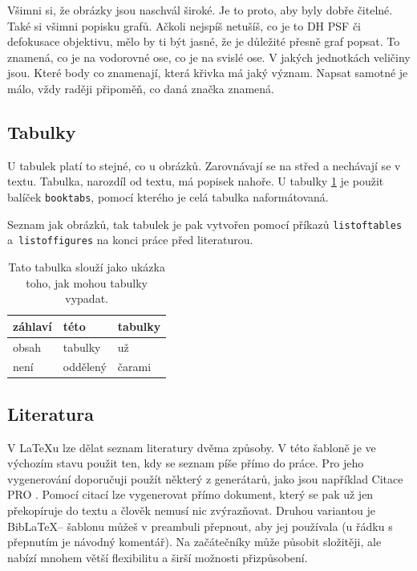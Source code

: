 \documentclass[12pt, a4paper,
    twoside,        %
    openright
]{report}
\begin{document}
Všimni si, že obrázky jsou naschvál široké. Je to proto, aby byly dobře čitelné. Také si všimni popisku grafů. Ačkoli nejspíš netušíš, co je to DH PSF či defokusace objektivu, mělo by ti být jasné, že je důležité přesně graf popsat. To znamená, co je na vodorovné ose, co je na svislé ose. V jakých jednotkách veličiny jsou. Které body co znamenají, která křivka má jaký význam. Napsat samotné \uv{$\Delta \varphi$} je málo, vždy raději připoměň, co daná značka znamená.

\subsection{Tabulky}

U tabulek platí to stejné, co u obrázků. Zarovnávají se na střed a nechávají se  v textu. Tabulka, narozdíl od textu, má popisek nahoře. U tabulky \ref{tab:ukazka} je použit balíček \texttt{booktabs}, pomocí kterého je celá tabulka naformátovaná.

Seznam jak obrázků, tak tabulek je pak vytvořen pomocí příkazů \texttt{listoftables} a~\texttt{list\-of\-fig\-ures} na konci práce před literaturou.

\begin{table}[b]
    \caption{Tato tabulka slouží jako ukázka toho, jak mohou tabulky vypadat.} %
    \label{tab:ukazka} %
    \centering
        \begin{tabular}{lll}
            \toprule %
            záhlaví& této & tabulky\\
            \midrule
            obsah&tabulky& už\\
            není & oddělený &čarami\\
            \bottomrule
        \end{tabular}
\end{table}

\subsection{Literatura}

V \LaTeX u lze dělat seznam literatury dvěma způsoby. V této šabloně je ve výchozím stavu použit ten, kdy se seznam píše přímo do práce. Pro jeho vygenerování doporučuji použít některý z generátarů, jako jsou například Citace PRO \cite{citacePRO}. Pomocí citací lze vygenerovat přímo dokument, který se pak už jen překopíruje do textu a člověk nemusí nic zvýrazňovat. Druhou variantou je Bib\LaTeX -- šablonu můžeš v preambuli přepnout, aby jej používala (u řádku s přepnutím je návodný komentář). Na začátečníky může působit složitěji, ale nabízí mnohem větší flexibilitu a širší možnosti přizpůsobení.
\end{document}
